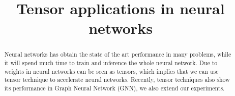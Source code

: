 \documentclass[onecolumn, conference]{IEEEtran}
\begin{document}
\title{Tensor applications in neural networks\\
}

\author{
\and
{}
}

\maketitle

\begin{abstract}
Neural networks has obtain the state of the art performance in many problems, while it will spend much time to train and inference the whole neural network. Due to weights in neural networks can be seen as tensors, which implies that we can use tensor technique to accelerate neural networks. 
Recently, tensor techniques also show its performance in Graph Neural Network (GNN), we also extend our experiments.
\end{abstract}
\end{document}
